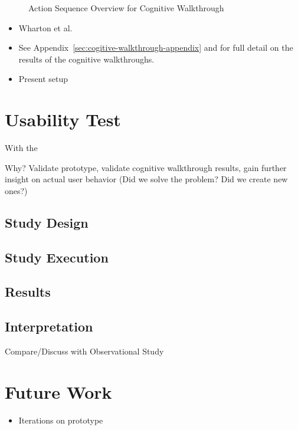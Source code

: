 \documentclass[sigplan,screen,nonacm,review]{acmart}
\begin{document}
\begin{figure}
	\centering
	\Description{}
	\caption{Action Sequence Overview for Cognitive Walkthrough}
	\label{fig:steps-prototype}
\end{figure}

\begin{itemize}
	\item Wharton et al. \cite{Wharton_Rieman_Clayton_Polson_1994}
	\item See Appendix~\ref{sec:cogitive-walkthrough-appendix} and for full detail on the results of the cognitive walkthroughs.
	\item Present setup
\end{itemize}


\section{Usability Test}



With the

Why? Validate prototype, validate cognitive walkthrough results, gain further insight on actual user behavior (Did we solve the problem? Did we create new ones?)

\subsection{Study Design}


\subsection{Study Execution}



\subsection{Results}

\subsection{Interpretation}
Compare/Discuss with Observational Study

\section{Future Work}
\label{sec:future}

\begin{itemize}
	\item Iterations on prototype
\end{itemize}
\end{document}
